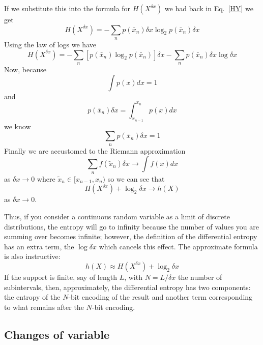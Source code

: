 \documentclass[12pt]{article}
\begin{document}
If we substitute this into the formula for $H(X^{\delta x})$ we had back in Eq.~\ref{HY} we get 
\begin{equation}
  H(X^{\delta x})=-\sum_n p(\bar{x}_n)\delta x \log_2{p(\bar{x}_n)\delta x}
\end{equation}
Using the law of logs we have
\begin{equation}
  H(X^{\delta x})=-\sum_n \left[p(\bar{x}_n) \log_2{p(\bar{x}_n)}\right] \delta x -\sum_np(\bar{x}_n)\delta x \log{\delta x}
\end{equation}
Now, because
\begin{equation}
  \int p(x)dx=1
\end{equation}
and 
\begin{equation}
  p(\bar{x}_n)\delta x=\int_{x_{n-1}}^{x_n}p(x)dx
\end{equation}
we know
\begin{equation}
  \sum_np(\bar{x}_n)\delta x=1     
\end{equation}
Finally we are accustomed to the Riemann approximation
\begin{equation}
  \sum_n f(\tilde{x}_n) \delta x\rightarrow \int f(x)dx 
\end{equation}
as $\delta x\rightarrow 0$ where $\tilde{x}_n\in [x_{n-1},x_n)$ so we can see that
    \begin{equation}
      H(X^{\delta x})+\log_2{\delta x}\rightarrow h(X)
    \end{equation}
    as $\delta x\rightarrow 0$.

Thus, if you consider a continuous random variable as a limit of
discrete distributions, the entropy will go to infinity because the
number of values you are summing over becomes infinite; however, the
definition of the differential entropy has an extra term, the
$\log{\delta x}$ which cancels this effect. The approximate formula is also instructive:
\begin{equation}
  h(X)\approx H(X^{\delta x}) +\log_2{\delta x}
\end{equation}
If the support is finite, say of length $L$, with $N=L/\delta x$ the
number of subintervals, then, approximately, the differential entropy
has two components: the entropy of the $N$-bit encoding of
the result and another term corresponding to what remains after the
$N$-bit encoding.

\subsection*{Changes of variable}
\end{document}
